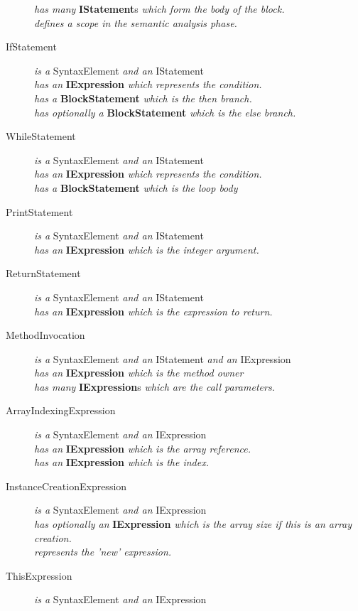 \documentclass[a4paper,11pt]{article}
\begin{document}
\begin{description}
\emph{has many} \textbf{IStatement}s \emph{which form the body of the block.} \\
\emph{defines a scope in the semantic analysis phase.}
\item[IfStatement] \emph{is a} SyntaxElement \emph{and an} IStatement \\
\emph{has an} \textbf{IExpression} \emph{which represents the condition.} \\
\emph{has a} \textbf{BlockStatement} \emph{which is the then branch.} \\
\emph{has optionally a} \textbf{BlockStatement} \emph{which is the else branch.}
\item[WhileStatement] \emph{is a} SyntaxElement \emph{and an} IStatement \\
\emph{has an} \textbf{IExpression} \emph{which represents the condition.} \\
\emph{has a} \textbf{BlockStatement} \emph{which is the loop body}
\item[PrintStatement] \emph{is a} SyntaxElement \emph{and an} IStatement \\
\emph{has an} \textbf{IExpression} \emph{which is the integer argument.}
\item[ReturnStatement] \emph{is a} SyntaxElement \emph{and an} IStatement \\
\emph{has an} \textbf{IExpression} \emph{which is the expression to return.}
\item[MethodInvocation] \emph{is a} SyntaxElement \emph{and an} IStatement \emph{and an} IExpression \\
\emph{has an} \textbf{IExpression} \emph{which is the method owner} \\
\emph{has many} \textbf{IExpression}s \emph{which are the call parameters.}
\\
\item[ArrayIndexingExpression] \emph{is a} SyntaxElement \emph{and an} IExpression \\
\emph{has an} \textbf{IExpression} \emph{which is the array reference.} \\
\emph{has an} \textbf{IExpression} \emph{which is the index.}
\item[InstanceCreationExpression] \emph{is a} SyntaxElement \emph{and an} IExpression \\
\emph{has optionally an} \textbf{IExpression} \emph{which is the array size if this is an array creation.} \\
\emph{represents the 'new' expression.}
\item[ThisExpression] \emph{is a} SyntaxElement \emph{and an} IExpression \\

\end{description}
\end{document}
